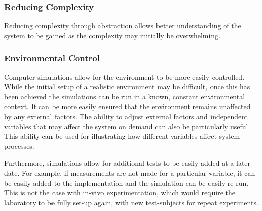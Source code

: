 \documentclass{UoYCSproject}
\begin{document}
\subsubsection{Reducing Complexity}
Reducing complexity through abstraction allows better understanding of the system to be gained as the complexity may initially be overwhelming.


\subsubsection{Environmental Control}
Computer simulations allow for the environment to be more easily controlled.
While the initial setup of a realistic environment may be difficult, once this has been achieved the simulations can be run in a known, constant environmental context.
It can be more easily ensured that the environment remains unaffected by any external factors.
The ability to adjust external factors and independent variables that may affect the system on demand can also be particularly useful.
This ability can be used for illustrating how different variables affect system processes.


Furthermore, simulations allow for additional tests to be easily added at a later date.
For example, if measurements are not made for a particular variable, it can be easily added to the implementation and the simulation can be easily re-run.
This is not the case with in-vivo experimentation, which would require the laboratory to be fully set-up again, with new test-subjects for repeat experiments.

\end{document}
